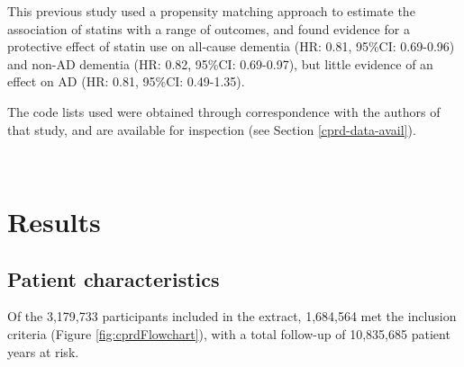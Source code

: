 \documentclass[a4paper, twoside]{templates/ociamthesis}
\begin{document}
This previous study used a propensity matching approach to estimate the association of statins with a range of outcomes, and found evidence for a protective effect of statin use on all-cause dementia (HR: 0.81, 95\%CI: 0.69-0.96) and non-AD dementia (HR: 0.82, 95\%CI: 0.69-0.97), but little evidence of an effect on AD (HR: 0.81, 95\%CI: 0.49-1.35).

The code lists used were obtained through correspondence with the authors of that study, and are available for inspection (see Section \ref{cprd-data-avail}).

~

\hypertarget{results-1}{%
\section{Results}\label{results-1}}

\hypertarget{patient-characteristics}{%
\subsection{Patient characteristics}\label{patient-characteristics}}

Of the 3,179,733 participants included in the extract, 1,684,564 met the inclusion criteria (Figure \ref{fig:cprdFlowchart}), with a total follow-up of 10,835,685 patient years at risk.

~
\end{document}
